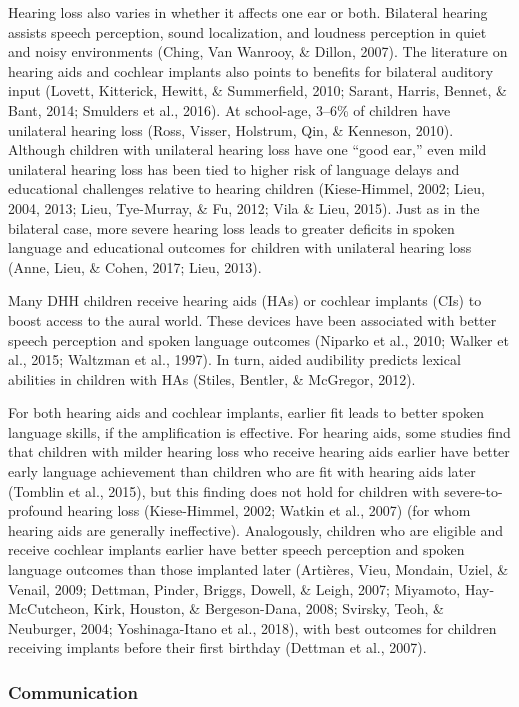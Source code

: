 \documentclass[
  english,
  man]{apa6}
\begin{document}
Hearing loss also varies in whether it affects one ear or both. Bilateral hearing assists speech perception, sound localization, and loudness perception in quiet and noisy environments (Ching, Van Wanrooy, \& Dillon, 2007). The literature on hearing aids and cochlear implants also points to benefits for bilateral auditory input (Lovett, Kitterick, Hewitt, \& Summerfield, 2010; Sarant, Harris, Bennet, \& Bant, 2014; Smulders et al., 2016). At school-age, 3--6\% of children have unilateral hearing loss (Ross, Visser, Holstrum, Qin, \& Kenneson, 2010). Although children with unilateral hearing loss have one \enquote{good ear,} even mild unilateral hearing loss has been tied to higher risk of language delays and educational challenges relative to hearing children (Kiese-Himmel, 2002; Lieu, 2004, 2013; Lieu, Tye-Murray, \& Fu, 2012; Vila \& Lieu, 2015). Just as in the bilateral case, more severe hearing loss leads to greater deficits in spoken language and educational outcomes for children with unilateral hearing loss (Anne, Lieu, \& Cohen, 2017; Lieu, 2013).

Many DHH children receive hearing aids (HAs) or cochlear implants (CIs) to boost access to the aural world. These devices have been associated with better speech perception and spoken language outcomes (Niparko et al., 2010; Walker et al., 2015; Waltzman et al., 1997). In turn, aided audibility predicts lexical abilities in children with HAs (Stiles, Bentler, \& McGregor, 2012).

For both hearing aids and cochlear implants, earlier fit leads to better spoken language skills, if the amplification is effective. For hearing aids, some studies find that children with milder hearing loss who receive hearing aids earlier have better early language achievement than children who are fit with hearing aids later (Tomblin et al., 2015), but this finding does not hold for children with severe-to-profound hearing loss (Kiese-Himmel, 2002; Watkin et al., 2007) (for whom hearing aids are generally ineffective). Analogously, children who are eligible and receive cochlear implants earlier have better speech perception and spoken language outcomes than those implanted later (Artières, Vieu, Mondain, Uziel, \& Venail, 2009; Dettman, Pinder, Briggs, Dowell, \& Leigh, 2007; Miyamoto, Hay-McCutcheon, Kirk, Houston, \& Bergeson-Dana, 2008; Svirsky, Teoh, \& Neuburger, 2004; Yoshinaga-Itano et al., 2018), with best outcomes for children receiving implants before their first birthday (Dettman et al., 2007).

\hypertarget{communication}{%
\subsubsection{Communication}\label{communication}}
\end{document}
